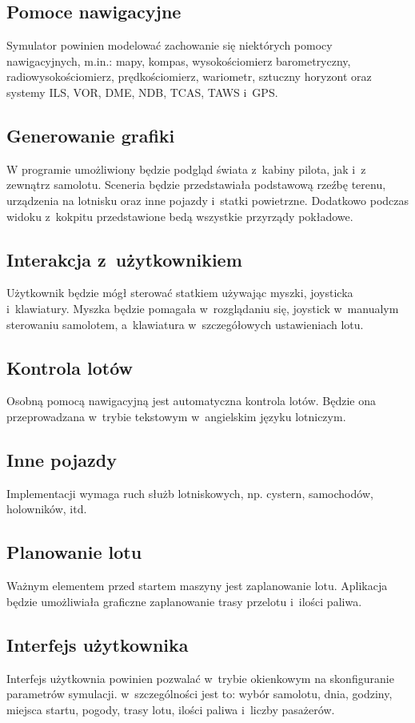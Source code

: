 \documentclass{mwrep}
\begin{document}
\subsection{Pomoce nawigacyjne}
Symulator powinien modelować zachowanie się niektórych pomocy nawigacyjnych, m.in.: mapy, kompas, wysokościomierz barometryczny, radiowysokościomierz, prędkościomierz, wariometr, sztuczny horyzont oraz systemy ILS, VOR, DME, NDB, TCAS, TAWS i~GPS.

\subsection{Generowanie grafiki}
W programie umożliwiony będzie podgląd świata z~kabiny pilota, jak i~z zewnątrz samolotu. Sceneria będzie przedstawiała podstawową rzeźbę terenu, urządzenia na lotnisku oraz inne pojazdy i~statki powietrzne. Dodatkowo podczas widoku z~kokpitu przedstawione bedą wszystkie przyrządy pokładowe.

\subsection{Interakcja z~użytkownikiem}
Użytkownik będzie mógł sterować statkiem używając myszki, joysticka i~klawiatury. Myszka będzie pomagała w~rozglądaniu się, joystick w~manualym sterowaniu samolotem, a~klawiatura w~szczegółowych ustawieniach lotu.

\subsection{Kontrola lotów}
Osobną pomocą nawigacyjną jest automatyczna kontrola lotów. Będzie ona przeprowadzana w~trybie tekstowym w~angielskim języku lotniczym.

\subsection{Inne pojazdy}
Implementacji wymaga ruch służb lotniskowych, np. cystern, samochodów, holowników, itd.

\subsection{Planowanie lotu}
Ważnym elementem przed startem maszyny jest zaplanowanie lotu. Aplikacja będzie umożliwiała graficzne zaplanowanie trasy przelotu i~ilości paliwa.

\subsection{Interfejs użytkownika}
Interfejs użytkownia powinien pozwalać w~trybie okienkowym na skonfiguranie parametrów symulacji. w~szczególności jest to: wybór samolotu, dnia, godziny, miejsca startu, pogody, trasy lotu, ilości paliwa i~liczby pasażerów.
\end{document}
